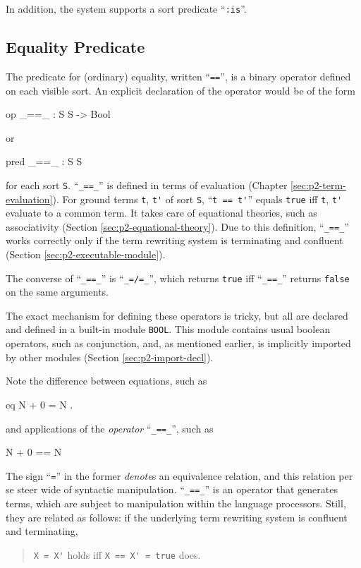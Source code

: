 \documentclass[a4paper]{memoir}
\begin{document}
In addition, the system supports a sort predicate ``\verb|:is|''.

\subsection{Equality Predicate}\label{sec:p2-equality-pred}

The predicate for (ordinary) equality, written ``\verb|==|'',\index{\texttt{==}}
is a binary operator defined on each visible sort.
An explicit declaration of the operator would be of the form
\begin{vvtm}
\begin{ccode}
  op _==_ : S S -> Bool
\end{ccode}
\end{vvtm}
or
\begin{vvtm}
\begin{ccode}
  pred _==_ : S S
\end{ccode}
\end{vvtm}
for each sort \verb|S|. ``\verb|_==_|'' is defined in terms of
evaluation (Chapter \ref{sec:p2-term-evaluation}).
For ground terms \verb|t|, \verb|t'| of sort \verb|S|,
``\verb|t == t'|'' equals \verb|true| iff \verb|t|, \verb|t'| evaluate to
a common term. It takes care of equational theories,
such as associativity (Section \ref{sec:p2-equational-theory}). Due to this
definition, ``\verb|_==_|'' works correctly only if the
term rewriting system
is terminating and
confluent (Section \ref{sec:p2-executable-module}).

The converse of ``\verb|_==_|'' is ``\verb|_=/=_|'',\index{\texttt{=/=}}
which returns
\verb|true| iff ``\verb|_==_|'' returns \verb|false| on the same arguments.

The exact mechanism for defining these operators is tricky, but all
are declared and defined in a built-in module \verb|BOOL|.
This module contains usual boolean operators, such as conjunction,
and, as mentioned earlier, is implicitly imported by other modules
(Section \ref{sec:p2-import-decl}).

Note the difference between equations, such as
\begin{vvtm}
\begin{ccode}
  eq N + 0 = N .
\end{ccode}
\end{vvtm}
and applications of the {\em operator} ``\verb|_==_|'', such as
\begin{vvtm}
\begin{ccode}
  N + 0 == N
\end{ccode}
\end{vvtm}
The sign ``\verb|=|'' in the former {\em denote\/}s an equivalence relation,
and this relation per se steer wide of syntactic manipulation.
``\verb|_==_|'' is an operator that generates terms, which are subject to
manipulation within the language processors. Still, they are related as
follows:
if the underlying term rewriting system is confluent and terminating,
\begin{quotation}
  \verb|X = X'| holds iff \verb|X == X' = true| does.
\end{quotation}
\end{document}
